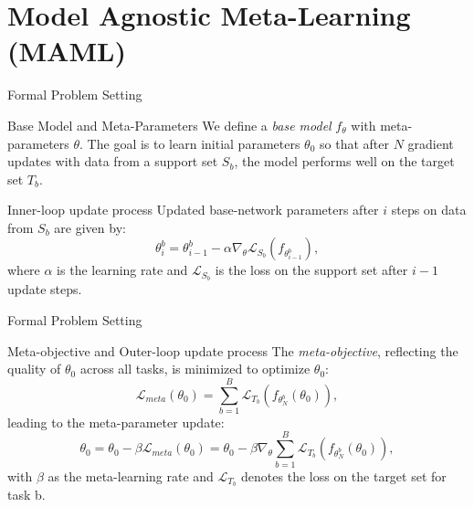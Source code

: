 \documentclass{beamer}
\begin{document}
\section{Model Agnostic Meta-Learning (MAML)}
\begin{frame}{Formal Problem Setting}
    \begin{block}{Base Model and Meta-Parameters}
        We define a \textit{base model} \( f_{\theta} \) with meta-parameters \( \theta \). The goal is to learn initial parameters \( \theta_0 \) so that after \( N \) gradient updates with data from a support set \( S_b \), the model performs well on the target set \( T_b \).
    \end{block}
    \begin{block}{Inner-loop update process}
        Updated base-network parameters after \( i \) steps on data from \( S_b \) are given by:
        \[ \theta^b_i = \theta^b_{i-1} - \alpha \nabla_{\theta} \mathcal{L}_{S_b}(f_{\theta^b_{i-1}}), \]
        where \( \alpha \) is the learning rate and \( \mathcal{L}_{S_b} \) is the loss on the support set after \( i-1 \) update steps.
    \end{block}
\end{frame}
\begin{frame}{Formal Problem Setting}
    \begin{block}{Meta-objective and Outer-loop update process}
        The \textit{meta-objective}, reflecting the quality of \( \theta_0 \) across all tasks, is minimized to optimize \( \theta_0 \):
        \[ \mathcal{L}_{meta}(\theta_0) = \sum_{b=1}^B \mathcal{L}_{T_b}(f_{\theta^b_N}(\theta_0)), \]
        leading to the meta-parameter update:
        \[ \theta_0 = \theta_0 - \beta \mathcal{L}_{meta}(\theta_0) = \theta_0 - \beta \nabla_{\theta} \sum_{b=1}^B \mathcal{L}_{T_b}(f_{\theta^b_N}(\theta_0)), \]
        with \( \beta \) as the meta-learning rate and $\mathcal{L}_{T_b}$
denotes the loss on the target set for task b.
    \end{block}
\end{frame}
\end{document}
